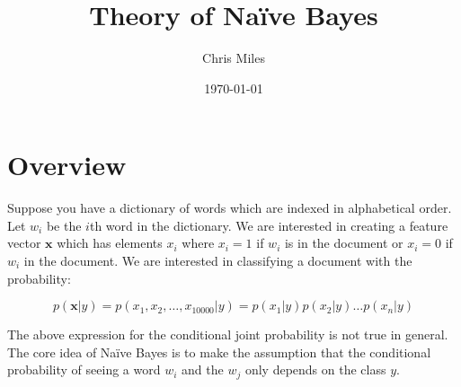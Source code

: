 \documentclass{article}
\title{Theory of Na\"ive Bayes}
\date{\today}
\author{Chris Miles}
\renewcommand{\vec}[1]{
	\mathbf{#1}
}
\begin{document}
	
	\maketitle
	
	\section{Overview}

	Suppose you have a dictionary of words which are indexed in alphabetical order. Let $w_i$ be the $i$th word in the dictionary. We are interested in creating a feature vector $\vec{x}$ which has elements $x_i$ where $x_i = 1$ if $w_i$ is in the document or $x_i = 0$ if $w_i$ in the document. We are interested in classifying a document with the probability:
	
	\[p(\vec{x}| y) = p(x_1, x_2, \dots, x_{10000} | y) =  p(x_1 | y)p(x_2 | y) \dots p(x_n|y)\]
		
	The above expression for the conditional joint probability is not true in general. The core idea of Na\"ive Bayes is to make the assumption that the conditional probability of seeing a word $w_i$ and the $w_j$ only depends on the class $y$.
\end{document}
